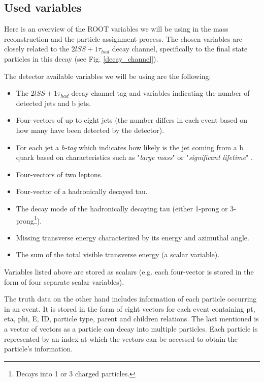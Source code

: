 \documentclass{ctuthesis}
\begin{document}
\subsection{Used variables}
Here is an overview of the ROOT variables we will be using in the mass reconstruction and the particle assignment process. The chosen variables are closely related to the $2lSS + 1 \tau _{had}$ decay channel, specifically to the final state particles in this decay (see Fig. \ref{decay_channel}).

The detector available variables we will be using are the following:

\begin{itemize}
    \item The $2lSS + 1 \tau _{had}$ decay channel tag and variables indicating the number of detected jets and b jets.
    \item Four-vectors of up to eight jets (the number differs in each event based on how many have been detected by the detector).
    \item For each jet a \emph{b-tag} which indicates how likely is the jet coming from a b quark based on characteristics such as "\emph{large mass}" or "\emph{significant lifetime}" \cite{b-tags}.
    \item Four-vectors of two leptons.
    \item Four-vector of a hadronically decayed tau.
    \item The decay mode of the hadronically decaying tau (either 1-prong or 3-prong\footnote{Decays into 1 or 3 charged particles.}).
    \item Missing transverse energy characterized by its energy and azimuthal angle.
    \item The sum of the total visible transverse energy (a scalar variable).
    
\end{itemize}

Variables listed above are stored as scalars (e.g. each four-vector is stored in the form of four separate scalar variables).

The truth data on the other hand includes information of each particle occurring in an event. It is stored in the form of eight vectors for each event containing pt, eta, phi, E, ID, particle type, parent and children relations. The last mentioned is a vector of vectors as a particle can decay into multiple particles. Each particle is represented by an index at which the vectors can be accessed to obtain the particle's information.
\end{document}
